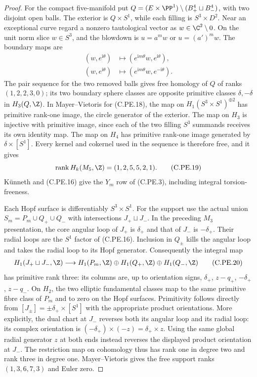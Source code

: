\begin{proof}
For the compact five-manifold put
$Q=(E\times\PP^1)\setminus(B^4_+\sqcup B^4_-)$,
with two disjoint open balls. The exterior is
$Q\times S^1$, while each filling is
$S^3\times D^2$. Near an exceptional curve regard
a nonzero tautological vector as
$w\in\C^2\setminus0$. On the unit norm slice
$w\in S^3$, and the blowdown is
$u=a^m w$ or $u=(a')^m w$. The boundary maps are
\[
 \begin{split}
 (w,e^{\mathrm i\theta})&\longmapsto
       (e^{\mathrm i m\theta}w,e^{\mathrm i\theta}),\\
 (w,e^{\mathrm i\theta})&\longmapsto
       (e^{\mathrm i m\theta}w,e^{-\mathrm i\theta}).
 \end{split}                                             \tag{C.PE.18}
\]
The pair sequence for the two removed balls gives
free homology of $Q$ of ranks $(1,2,2,3,0)$; its
two boundary sphere classes are opposite
primitive classes $\delta,-\delta$ in $H_3(Q,\Z)$.
In Mayer--Vietoris for (C.PE.18), the map on
$H_1(S^3\times S^1)^{\oplus2}$ has primitive
rank-one image, the circle generator of the
exterior. The map on $H_3$ is injective with
primitive image, since each of the two filling
$S^3$ summands receives its own identity map.
The map on $H_4$ has primitive rank-one image
generated by $\delta\times[S^1]$. Every kernel
and cokernel used in the sequence is therefore
free, and it gives
\[
       \operatorname{rank}H_k(M_5,\Z)=(1,2,5,5,2,1).
                                                               \tag{C.PE.19}
\]
K\"unneth and (C.PE.16) give the $Y_m$ row of
(C.PE.3), including integral torsion-freeness.

Each Hopf surface is differentiably $S^3\times S^1$.
For the support use the actual union
$S_m=P_m\cup Q_+\cup Q_-$ with intersections
$J_+\sqcup J_-$. In the preceding $M_3$ presentation,
the core angular loop of $J_+$ is $\delta_+$ and
that of $J_-$ is $-\delta_+$. Their radial loops
are the $S^1$ factor of (C.PE.16). Inclusion in
$Q_\pm$ kills the angular loop and takes the
radial loop to its Hopf generator. Consequently
the integral map
\[
 \begin{split}
 H_1(J_+\sqcup J_-,\Z)\longrightarrow
 H_1(P_m,\Z)\oplus H_1(Q_+,\Z)\oplus H_1(Q_-,\Z)
 \end{split}                                             \tag{C.PE.20}
\]
has primitive rank three: its columns are, up to
orientation signs, $\delta_+$, $z-q_+$,
$-\delta_+$, $z-q_-$. On $H_2$, the two elliptic
fundamental classes map to the same primitive
fibre class of $P_m$ and to zero on the Hopf
surfaces. Primitivity follows directly from
$[J_\pm]=\pm\delta_+\times[S^1]$ with the appropriate
product orientations. More explicitly, the dual chart at
$J_-$ reverses both its angular loop and its radial loop:
its complex orientation is
$(-\delta_+)\times(-z)=\delta_+\times z$.
Using the same global radial generator $z$ at both
ends instead reverses the displayed product orientation
at $J_-$. The restriction map on
cohomology thus has rank one in degree two and
rank three in degree one. Mayer--Vietoris gives
the free support ranks $(1,3,6,7,3)$ and Euler zero.


\end{proof}
